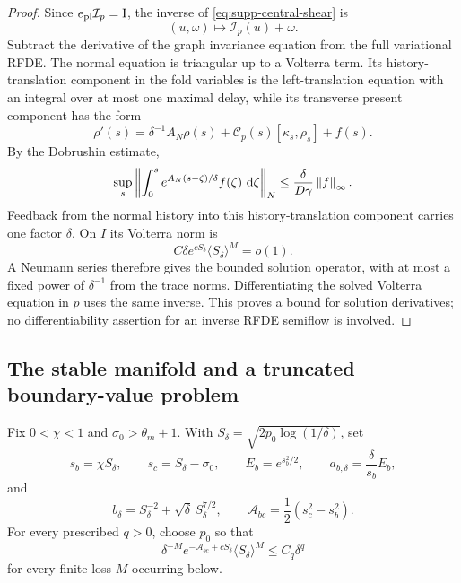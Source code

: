 \begin{proof}
Since \(e_{\rm pl}\mathcal I_p=\mathrm I\), the inverse of
\cref{eq:supp-central-shear} is
\[
 (u,\omega)\longmapsto\mathcal I_p(u)+\omega.
\]
Subtract the derivative of the graph invariance equation from the full
variational RFDE.  The normal equation is triangular up to a Volterra
term.  Its history-translation component in the fold variables is the
left-translation equation with
an integral over at most one maximal delay, while its transverse present
component has the form
\begin{equation}
 \rho'(s)=\delta^{-1}A_N\rho(s)
          +\mathcal C_p(s)[\kappa_s,\rho_s]+f(s).
 \label{eq:supp-central-normal-equation}
\end{equation}
By the Dobrushin estimate,
\begin{equation}
 \sup_s\left\lVert\int_0^s
 e^{A_N(s-\zeta)/\delta}f(\zeta)\,\,\mathrm d\zeta\right\rVert_N
 \le\frac{\delta}{D\gamma}\left\lVert f\right\rVert_\infty.
 \label{eq:supp-central-poisson}
\end{equation}
Feedback from the normal history into this history-translation component carries
one factor \(\delta\).  On \(I\) its Volterra norm is
\[
 C\delta e^{cS_\delta}\langle S_\delta\rangle^M=o(1).
\]
A Neumann series therefore gives the bounded solution operator, with at most a fixed
power of \(\delta^{-1}\) from the trace norms.  Differentiating the solved
Volterra equation in \(p\) uses the same inverse.  This proves a bound for
solution derivatives; no differentiability assertion for an inverse RFDE
semiflow is involved.
\end{proof}

\subsection{The stable manifold and a truncated boundary-value problem}

Fix \(0<\chi<1\) and \(\sigma_0>\theta_m+1\).  With
\(S_\delta=\sqrt{2p_0\log(1/\delta)}\), set
\begin{equation}
 s_b=\chi S_\delta,\qquad
 s_c=S_\delta-\sigma_0,\qquad
 E_b=e^{s_b^2/2},\qquad
 a_{b,\delta}=\frac{\delta}{s_b}E_b,
 \label{eq:supp-central-cuts}
\end{equation}
and
\begin{equation}
 b_\delta=S_\delta^{-2}+\sqrt\delta\,S_\delta^{7/2},
 \qquad
 \mathcal A_{bc}=\frac12(s_c^2-s_b^2).
 \label{eq:supp-central-overlap-scale}
\end{equation}
For every prescribed \(q>0\), choose \(p_0\) so that
\begin{equation}
 \delta^{-M}e^{-\mathcal A_{bc}+cS_\delta}
       \langle S_\delta\rangle^M\le C_q\delta^q
 \label{eq:supp-central-action-choice}
\end{equation}
for every finite loss \(M\) occurring below.

